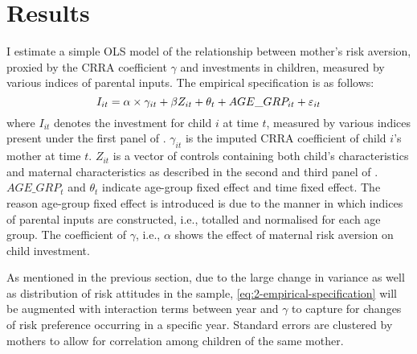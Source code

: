 \documentclass[]{article}
\begin{document}

\section{Results}
I estimate a simple OLS model of the relationship between mother's risk aversion, proxied by the CRRA coefficient $\gamma$ and investments in children, measured by various indices of parental inputs. The empirical specification is as follows:
\begin{equation}
	I_{it} = \alpha \times \gamma_{it} + \beta{\boldmath Z_{it}} + \theta_t + AGE\_GRP_{it} + \varepsilon_{it}
	\label{eq:2-empirical-specification}
\end{equation}
where $I_{it}$ denotes the investment for child $i$ at time $t$, measured by various indices present under the first panel of . $\gamma_{it}$ is the imputed CRRA coefficient of child $i$'s mother at time $t$. $Z_{it}$ is a vector of controls containing both child's characteristics and maternal characteristics as described in the second and third panel of . $AGE\_GRP_t$ and $\theta_t$ indicate age-group fixed effect and time fixed effect. The reason age-group fixed effect is introduced is due to the manner in which indices of parental inputs are constructed, i.e., totalled and normalised for each age group. The coefficient of $\gamma$, i.e., $\alpha$ shows the effect of maternal risk aversion on child investment. 

As mentioned in the previous section, due to the large change in variance as well as distribution of risk attitudes in the sample, \eqref{eq:2-empirical-specification} will be augmented with interaction terms between year and $\gamma$ to capture for changes of risk preference occurring in a specific year. Standard errors are clustered by mothers to allow for correlation among children of the same mother. 
\end{document}
